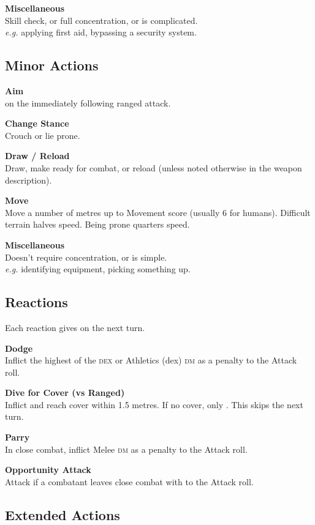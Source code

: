 \documentclass{cheatsheet}
\begin{document}
\begin{multicols}{3}
\textbf{Miscellaneous}\\
Skill check, or full concentration, or is complicated.\\
\textit{e.g.} applying first aid, bypassing a security system.

\subsection{Minor Actions}

\textbf{Aim}\\
 on the immediately following ranged attack.

\textbf{Change Stance}\\
Crouch or lie prone.

\textbf{Draw / Reload}\\
Draw, make ready for combat, or reload (unless noted otherwise in the
weapon description).

\textbf{Move}\\
Move a number of metres up to Movement score (usually 6 for humans).
Difficult terrain halves speed.  Being prone quarters speed.

\textbf{Miscellaneous}\\
Doesn't require concentration, or is simple.\\
\textit{e.g.} identifying equipment, picking something up.

\subsection{Reactions}

Each reaction gives  on the next turn.

\textbf{Dodge}\\
Inflict the highest of the \textsc{dex} or Athletics (dex) \textsc{dm}
as a penalty to the Attack roll.

\textbf{Dive for Cover (vs Ranged)}\\
Inflict  and reach cover within 1.5 metres.  If no cover,
only .  This skips the next turn.

\textbf{Parry}\\
In close combat, inflict Melee \textsc{dm} as a penalty to the Attack
roll.

\textbf{Opportunity Attack}\\
Attack if a combatant leaves close combat with  to the
Attack roll.

\subsection{Extended Actions}


\end{multicols}
\end{document}
